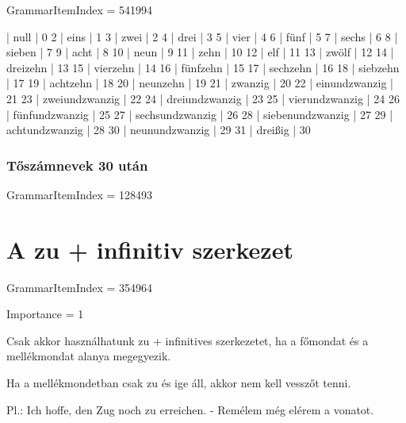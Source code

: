 \documentclass{article}
\newenvironment{desc}{\verbatim}{\endverbatim}
\newenvironment{exmp}{\verbatim}{\endverbatim}
\begin{document}
GrammarItemIndex = 541994

\begin{exmp}
1 | null | 0
2 | eins | 1
3 | zwei | 2
4 | drei | 3
5 | vier | 4
6 | fünf | 5
7 | sechs | 6
8 | sieben | 7
9 | acht | 8
10 | neun | 9
11 | zehn | 10
12 | elf | 11
13 | zwölf | 12
14 | dreizehn | 13
15 | vierzehn | 14
16 | fünfzehn | 15
17 | sechzehn | 16
18 | siebzehn | 17
19 | achtzehn | 18
20 | neunzehn | 19
21 | zwanzig | 20
22 | einundzwanzig | 21
23 | zweiundzwanzig | 22
24 | dreiundzwanzig | 23
25 | vierundzwanzig | 24
26 | fünfundzwanzig | 25
27 | sechsundzwanzig | 26
28 | siebenundzwanzig | 27
29 | achtundzwanzig | 28
30 | neunundzwanzig | 29
31 | dreißig | 30
\end{exmp}

\subsubsection{Tőszámnevek 30 után}

GrammarItemIndex = 128493

\section{A zu + infinitiv szerkezet}

GrammarItemIndex = 354964

Importance = 1

\begin{desc}
Csak akkor használhatunk zu + infinitives szerkezetet, ha a főmondat és a mellékmondat alanya megegyezik.

Ha a mellékmondetban csak zu és ige áll, akkor nem kell vesszőt tenni.

Pl.: Ich hoffe, den Zug noch zu erreichen. - Remélem még elérem a vonatot.
\end{desc}
\end{document}
